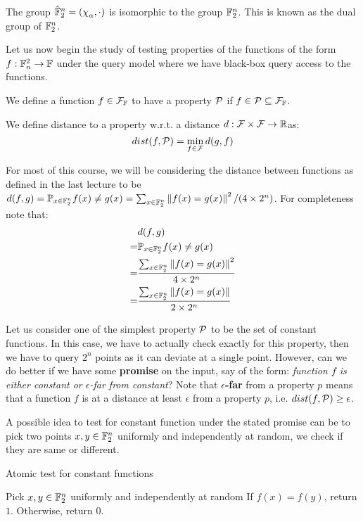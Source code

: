 \begin{theorem}
    The group $\hat{\F}_2^n = (\chi_\alpha,\cdot)$ is isomorphic to the group $\mathbb{F}_2^n$. This is known as the dual group of $\mathbb{F}_2^n$.
\end{theorem}

Let us now begin the study of testing properties of the functions of the form ${f} : {\mathbb{F}_n^2} \rightarrow {\mathbb{F}}$ under the query model where we have black-box query access to the functions. 
\begin{definition}[Property $\sP$]
    We define a function $f \in \mathcal{F}_{\mathbb{F}}$ to have a property $\sP$ if $f \in \mathcal{P} \subseteq \mathcal{F}_{\mathbb{F}}$.
\end{definition}

\begin{definition}
    We define distance to a property w.r.t. a distance ${d} : {\mathcal{F}\times\mathcal{F}} \rightarrow {\mathbb{R}}$as:
    \[
    dist(f,\mathcal{P}) = \min_{f \in \mathcal{F}} d(g,f)
    \]
\end{definition}

For most of this course, we will be considering the distance between functions as defined in the last lecture to be $d(f,g) = \mathbb{P}_{x \in \mathbb{F}_2^n} f(x)\neq g(x) = \sum_{x\in\mathbb{F}_2^n} \left\|{f(x)=g(x)}\right\|^2/(4\times 2^n)$. For completeness note that:
\begin{align*}
    &d(f,g)\\
    =&\mathbb{P}_{x \in \mathbb{F}_2^n} f(x)\neq g(x)\\
    =&\frac{\sum_{x\in\mathbb{F}_2^n} \left\|{f(x)=g(x)}\right\|^2}{4\times 2^n}\\
    =&\frac{\sum_{x\in\mathbb{F}_2^n} \left\|{f(x)=g(x)}\right\|}{2\times2^n}
\end{align*}

Let us consider one of the simplest property $\sP$ to be the set of constant functions. In this case, we have to actually check exactly for this property, then we have to query $2^n$ points as it can deviate at a single point. However, can we do better if we have some \textbf{promise} on the input, say of the form: \emph{function $f$ is either constant or $\epsilon$-far from constant}? Note that \textbf{$\epsilon$-far} from a property $p$ means that a function $f$ is at a distance at least $\epsilon$ from a property $p$, i.e. $dist(f,\mathcal{P}) \geq \epsilon$.

A possible idea to test for constant function under the stated promise can be to pick two points $x,y \in \mathbb{F}_2^n$ uniformly and independently at random, we check if they are same or different.

\begin{algorithm}
    \caption{Atomic test for constant functions}\label{Alg:Atomic Test Constant}
    \begin{algorithmic}
        \State Pick $x,y \in \mathbb{F}_2^n$ uniformly and independently at random
        \State If $f(x) = f(y)$, return $1$. Otherwise, return $0$.
    \end{algorithmic}
\end{algorithm}


